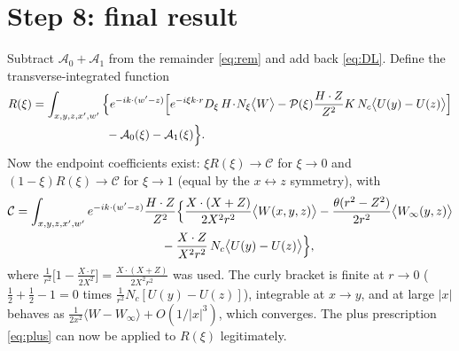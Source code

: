\documentclass[11pt,a4paper]{article}
\newcommand{\Nc}{N_c}
\newcommand{\Winf}{W_\infty}
\newcommand{\cl}[1]{\big\langle #1\big\rangle}
\begin{document}
\section{Step 8: final result}
Subtract $\mathcal A_0+\mathcal A_1$ from the remainder \eqref{eq:rem} and add back \eqref{eq:DL}. Define the
transverse-integrated function
\begin{align}
R(\xi)&=\int_{x,y,z,x',w'}\Big\{e^{-ik\cdot(w'-z)}\Big[e^{-i\xi k\cdot r}D_\xi\,H\!\cdot\!N_\xi\cl{W}
-\mathcal P(\xi)\frac{H\cdot Z}{Z^2}K\,\Nc\cl{U(y)-U(z)}\Big]\notag\\
&\hspace{2.2cm}-\mathcal A_0(\xi)-\mathcal A_1(\xi)\Big\}.
\label{eq:R}
\end{align}
Now the endpoint coefficients exist: $\xi R(\xi)\to\mathcal C$ for $\xi\to0$ and
$(1-\xi)R(\xi)\to\mathcal C$ for $\xi\to1$ (equal by the $x\leftrightarrow z$ symmetry), with
\begin{align}
\mathcal C&=\int_{x,y,z,x',w'}e^{-ik\cdot(w'-z)}\frac{H\cdot Z}{Z^2}
\Big\{\frac{X\cdot(X+Z)}{2X^2r^2}\cl{W(x,y,z)}-\frac{\theta(r^2-Z^2)}{2r^2}\cl{\Winf(y,z)}\notag\\
&\hspace{4.2cm}-\frac{X\cdot Z}{X^2r^2}\,\Nc\cl{U(y)-U(z)}\Big\},
\label{eq:C}
\end{align}
where $\frac1{r^2}\big[1-\frac{X\cdot r}{2X^2}\big]=\frac{X\cdot(X+Z)}{2X^2r^2}$ was used. The curly bracket
is finite at $r\to0$ ($\tfrac12+\tfrac12-1=0$ times $\frac{1}{r^2}\Nc[U(y)-U(z)]$), integrable at
$x\to y$, and at large $|x|$ behaves as $\frac{1}{2x^2}\cl{W-\Winf}+O(1/|x|^3)$, which converges.
The plus prescription \eqref{eq:plus} can now be applied to $R(\xi)$ legitimately.
\end{document}
